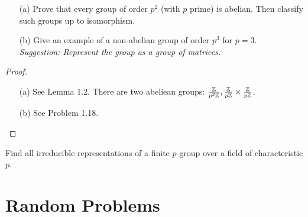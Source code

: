 \begin{prob}[F2014-Q5]
    \phantom{text}
    \begin{enumerate}
        \item[(a)] Prove that every group of order \( p^2 \) (with \( p \) prime) is abelian. Then classify such groups up to isomorphism.
    
        \item[(b)] Give an example of a non-abelian group of order \( p^3 \) for \( p = 3 \). \\
        \emph{Suggestion: Represent the group as a group of matrices.}
    \end{enumerate}    
\end{prob}
\begin{proof}
    \begin{itemize}
        \item[(a)] See Lemma 1.2. There are two abeliean groups: $\frac{\mathbb{Z}}{p^2\mathbb{Z}}, \frac{\mathbb{Z}}{p\mathbb{Z}}\times\frac{\mathbb{Z}}{p\mathbb{Z}}$.
        \item[(b)] See Problem 1.18.
    \end{itemize}
\end{proof}

\begin{prob}[F2019-Q4, S2015-Q3]
    Find all irreducible representations of a finite $p$-group over a field of characteristic $p$.
\end{prob}


\section{Random Problems}

